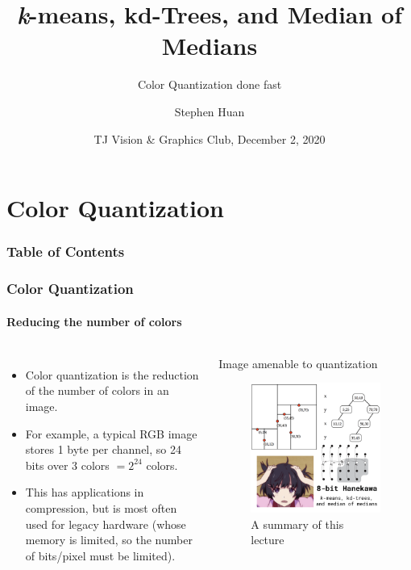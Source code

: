 \documentclass{beamer}                             %
\title[]{\textit{k}-means, kd-Trees, and Median of Medians}
\subtitle{Color Quantization done fast}
\author[Huan]{Stephen Huan\inst{1}}
\institute[TJHSST]
{
  \inst{1}
  Thomas Jefferson High School for Science and Technology
}
\date[]{TJ Vision \& Graphics Club, December 2, 2020}
\begin{document}
\frame{\titlepage}

\section{Color Quantization}

\begin{frame}
\frametitle{Table of Contents}
\tableofcontents[currentsection]
\end{frame}

\begin{frame}
\frametitle{Color Quantization}
\framesubtitle{Reducing the number of colors}
\begin{columns}
  \begin{itemize}[<+->]
    \item \alert{Color quantization} is the
      reduction of the number of colors in an image.
    \item For example, a typical RGB image stores 1 byte per
      channel, so 24 bits over 3 colors \( = 2^{24} \) colors.
    \item This has applications in compression, but is
      most often used for legacy hardware (whose memory is
      limited, so the number of bits/pixel must be limited).
  \end{itemize}

  \begin{exampleblock}{Image amenable to quantization} 
    \begin{figure}[h!]
      \centering
      \includegraphics[scale=0.15]{cover_image.png}
      \caption{A summary of this lecture}
    \end{figure}
  \end{exampleblock}
\end{columns}
\end{frame}
\end{document}
